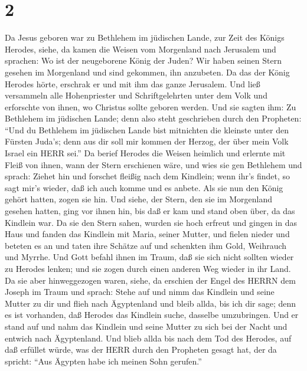 \hypertarget{section-1}{%
\section{2}\label{section-1}}

 Da Jesus geboren war zu Bethlehem im jüdischen Lande, zur
Zeit des Königs Herodes, siehe, da kamen die Weisen vom Morgenland nach
Jerusalem und sprachen:  Wo ist der neugeborene König der
Juden? Wir haben seinen Stern gesehen im Morgenland und sind gekommen,
ihn anzubeten.  Da das der König Herodes hörte, erschrak er
und mit ihm das ganze Jerusalem.  Und ließ versammeln alle
Hohenpriester und Schriftgelehrten unter dem Volk und erforschte von
ihnen, wo Christus sollte geboren werden.  Und sie sagten
ihm: Zu Bethlehem im jüdischen Lande; denn also steht geschrieben durch
den Propheten:  ``Und du Bethlehem im jüdischen Lande bist
mitnichten die kleinste unter den Fürsten Juda's; denn aus dir soll mir
kommen der Herzog, der über mein Volk Israel ein HERR sei.''
 Da berief Herodes die Weisen heimlich und erlernte mit
Fleiß von ihnen, wann der Stern erschienen wäre,  und wies
sie gen Bethlehem und sprach: Ziehet hin und forschet fleißig nach dem
Kindlein; wenn ihr's findet, so sagt mir's wieder, daß ich auch komme
und es anbete.  Als sie nun den König gehört hatten, zogen
sie hin. Und siehe, der Stern, den sie im Morgenland gesehen hatten,
ging vor ihnen hin, bis daß er kam und stand oben über, da das Kindlein
war.  Da sie den Stern sahen, wurden sie hoch erfreut
 und gingen in das Haus und fanden das Kindlein mit Maria,
seiner Mutter, und fielen nieder und beteten es an und taten ihre
Schätze auf und schenkten ihm Gold, Weihrauch und Myrrhe. 
Und Gott befahl ihnen im Traum, daß sie sich nicht sollten wieder zu
Herodes lenken; und sie zogen durch einen anderen Weg wieder in ihr
Land.  Da sie aber hinweggezogen waren, siehe, da erschien
der Engel des HERRN dem Joseph im Traum und sprach: Stehe auf und nimm
das Kindlein und seine Mutter zu dir und flieh nach Ägyptenland und
bleib allda, bis ich dir sage; denn es ist vorhanden, daß Herodes das
Kindlein suche, dasselbe umzubringen.  Und er stand auf und
nahm das Kindlein und seine Mutter zu sich bei der Nacht und entwich
nach Ägyptenland.  Und blieb allda bis nach dem Tod des
Herodes, auf daß erfüllet würde, was der HERR durch den Propheten gesagt
hat, der da spricht: ``Aus Ägypten habe ich meinen Sohn gerufen.''
